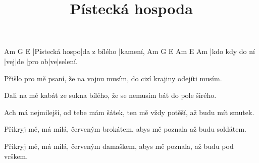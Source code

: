 \documentclass{song}
\title{Pístecká hospoda}
\begin{document}
\strophe
Am             G            E
|Pístecká hospo|da z bílého |kamení,
Am             G   E   Am     E  Am
|kdo kdy do ní |vej|de |pro ob|ve|selení.
\endstrophe

\strophe*
Přišlo pro mě psaní, že na vojnu musím,
do cizí krajiny odejíti musím.
\endstrophe

\strophe*
Dali na mě kabát ze sukna bílého,
že se nemusím bát do pole širého.
\endstrophe

\strophe*
Ach má nejmilejší, od tebe mám šátek,
ten mě vždy potěší, až budu mít smutek.
\endstrophe

\strophe*
Přikryj mě, má milá, červeným brokátem,
abys mě poznala až budu soldátem.
\endstrophe

\strophe*
Přikryj mě, má milá, červeným damaškem,
abys mě poznala, až budu pod vrškem.
\endstrophe
\end{document}

